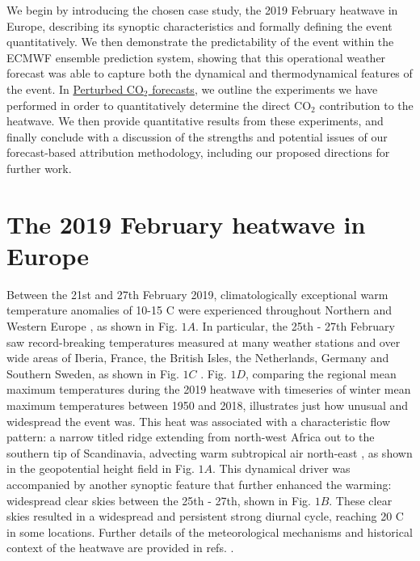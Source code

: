   We begin by introducing the chosen case study, the 2019 February heatwave in Europe, describing its synoptic characteristics and formally defining the event quantitatively. We then demonstrate the predictability of the event within the ECMWF ensemble prediction system, showing that this operational weather forecast was able to capture both the dynamical and thermodynamical features of the event. In \hyperref[Ch4:experiments]{Perturbed CO$_2$ forecasts}, we outline the experiments we have performed in order to quantitatively determine the direct CO$_2$ contribution to the heatwave. We then provide quantitative results from these experiments, and finally conclude with a discussion of the strengths and potential issues of our forecast-based attribution methodology, including our proposed directions for further work.

\section{The 2019 February heatwave in Europe}\label{Ch4:heatwave}

  Between the 21st and 27th February 2019, climatologically exceptional warm temperature anomalies of 10-15 \degree C were experienced throughout Northern and Western Europe \citep{young_record-breaking_2020}, as shown in Fig. $1A$. In particular, the 25th - 27th February saw record-breaking temperatures measured at many weather stations and over wide areas of Iberia, France, the British Isles, the Netherlands, Germany and Southern Sweden, as shown in Fig. $1C$ \citep{cornes_ensemble_2018}. Fig. $1D$, comparing the regional mean maximum temperatures during the 2019 heatwave with timeseries of winter mean maximum temperatures between 1950 and 2018, illustrates just how unusual and widespread the event was. This heat was associated with a characteristic flow pattern: a narrow titled ridge extending from north-west Africa out to the southern tip of Scandinavia, advecting warm subtropical air north-east \citep{sousa_european_2018}, as shown in the geopotential height field in Fig. $1A$. This dynamical driver was accompanied by another synoptic feature that further enhanced the warming: widespread clear skies between the 25th - 27th, shown in Fig. $1B$. These clear skies resulted in a widespread and persistent strong diurnal cycle, reaching 20 \degree C in some locations. Further details of the meteorological mechanisms and historical context of the heatwave are provided in refs. \citep{young_record-breaking_2020,kendon_temperature_2020,christidis_extremely_2021}.
  
